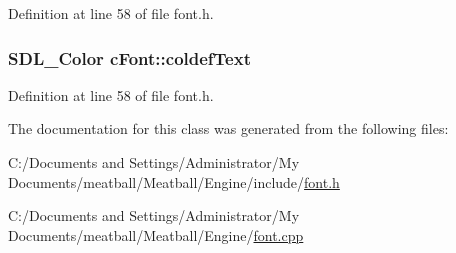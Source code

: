 Definition at line 58 of file font.\-h.

\hypertarget{classc_font_a96a95a892c62f8097c0da7388bc7b948}{
\subsubsection[{coldef\-Text}]{\setlength{\rightskip}{0pt plus 5cm}S\-D\-L\-\_\-\-Color c\-Font\-::coldef\-Text}}\label{classc_font_a96a95a892c62f8097c0da7388bc7b948}


Definition at line 58 of file font.\-h.



The documentation for this class was generated from the following files\-:\begin{DoxyCompactItemize}
\item 
C\-:/\-Documents and Settings/\-Administrator/\-My Documents/meatball/\-Meatball/\-Engine/include/\hyperlink{font_8h}{font.\-h}\item 
C\-:/\-Documents and Settings/\-Administrator/\-My Documents/meatball/\-Meatball/\-Engine/\hyperlink{font_8cpp}{font.\-cpp}\end{DoxyCompactItemize}
